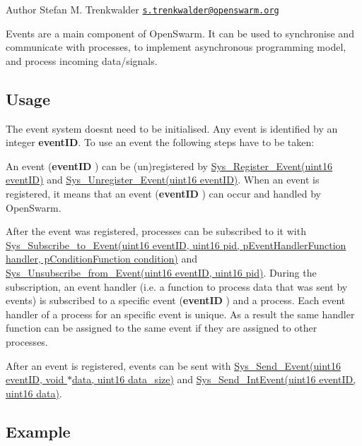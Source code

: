 \begin{DoxyAuthor}{Author}
Stefan M. Trenkwalder \href{mailto:s.trenkwalder@openswarm.org}{\tt s.\+trenkwalder@openswarm.\+org}
\end{DoxyAuthor}
Events are a main component of Open\+Swarm. It can be used to synchronise and communicate with processes, to implement asynchronous programming model, and process incoming data/signals.\hypertarget{group__events_events_usage}{}\subsection{Usage}\label{group__events_events_usage}
The event system doesn\textquotesingle{}t need to be initialised. Any event is identified by an integer {\bfseries event\+I\+D}. To use an event the following steps have to be taken\+:
\begin{DoxyEnumerate}
\item An event ({\bfseries event\+I\+D} ) can be (un)registered by \hyperlink{events_8h_a386acd8573c1118d80986721664d2689}{Sys\+\_\+\+Register\+\_\+\+Event(uint16 event\+I\+D)} and \hyperlink{events_8h_a1d203ee6c6d21cb00d5b84a03bbbda6b}{Sys\+\_\+\+Unregister\+\_\+\+Event(uint16 event\+I\+D)}. When an event is registered, it means that an event ({\bfseries event\+I\+D} ) can occur and handled by Open\+Swarm.
\item After the event was registered, processes can be subscribed to it with \hyperlink{events_8h_abbd55109964743556ffc20f8520bfabf}{Sys\+\_\+\+Subscribe\+\_\+to\+\_\+\+Event(uint16 event\+I\+D, uint16 pid, p\+Event\+Handler\+Function handler, p\+Condition\+Function condition)} and \hyperlink{events_8h_a0f37de65bd64e262ea80d96d7e691a8d}{Sys\+\_\+\+Unsubscribe\+\_\+from\+\_\+\+Event(uint16 event\+I\+D, uint16 pid)}. During the subscription, an event handler (i.\+e. a function to process data that was sent by events) is subscribed to a specific event ({\bfseries event\+I\+D} ) and a process. Each event handler of a process for an specific event is unique. As a result the same handler function can be assigned to the same event if they are assigned to other processes.
\item After an event is registered, events can be sent with \hyperlink{events_8h_a24dadcefc1b4c45c50fb351efc8e841c}{Sys\+\_\+\+Send\+\_\+\+Event(uint16 event\+I\+D, void $\ast$data, uint16 data\+\_\+size)} and \hyperlink{events_8h_ae2b6a4d1db2b3fb8777fa56297001d05}{Sys\+\_\+\+Send\+\_\+\+Int\+Event(uint16 event\+I\+D, uint16 data)}.
\end{DoxyEnumerate}\hypertarget{group__events_events_example}{}\subsection{Example}\label{group__events_events_example}

